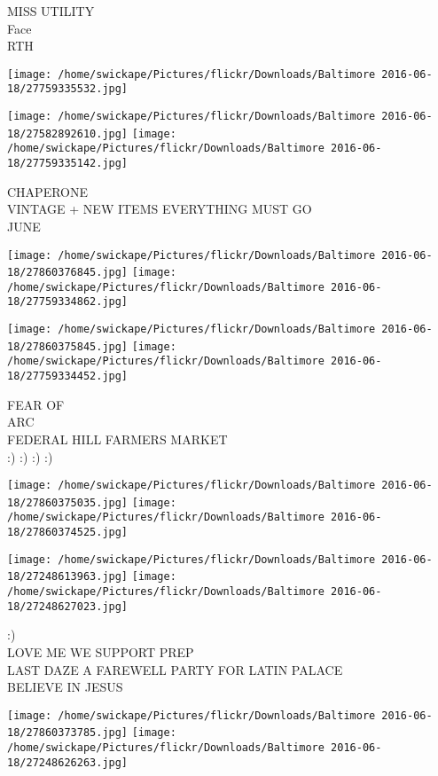 \documentclass[10pt,letterpaper]{article}
\begin{document}
MISS UTILITY\\
Face\\
RTH\\
\pagebreak

\texttt{[image: /home/swickape/Pictures/flickr/Downloads/Baltimore 2016-06-18/27759335532.jpg]}

\vspace{0.25in}
\texttt{[image: /home/swickape/Pictures/flickr/Downloads/Baltimore 2016-06-18/27582892610.jpg]}
\texttt{[image: /home/swickape/Pictures/flickr/Downloads/Baltimore 2016-06-18/27759335142.jpg]}

CHAPERONE\\
VINTAGE + NEW ITEMS EVERYTHING MUST GO\\
JUNE\\
\pagebreak

\texttt{[image: /home/swickape/Pictures/flickr/Downloads/Baltimore 2016-06-18/27860376845.jpg]}
\texttt{[image: /home/swickape/Pictures/flickr/Downloads/Baltimore 2016-06-18/27759334862.jpg]}

\texttt{[image: /home/swickape/Pictures/flickr/Downloads/Baltimore 2016-06-18/27860375845.jpg]}
\texttt{[image: /home/swickape/Pictures/flickr/Downloads/Baltimore 2016-06-18/27759334452.jpg]}

FEAR OF\\
ARC\\
FEDERAL HILL FARMERS MARKET\\
:) :) :) :)\\
\pagebreak

\texttt{[image: /home/swickape/Pictures/flickr/Downloads/Baltimore 2016-06-18/27860375035.jpg]}
\texttt{[image: /home/swickape/Pictures/flickr/Downloads/Baltimore 2016-06-18/27860374525.jpg]}

\texttt{[image: /home/swickape/Pictures/flickr/Downloads/Baltimore 2016-06-18/27248613963.jpg]}
\texttt{[image: /home/swickape/Pictures/flickr/Downloads/Baltimore 2016-06-18/27248627023.jpg]}

:)\\
LOVE ME WE SUPPORT PREP\\
LAST DAZE A FAREWELL PARTY FOR LATIN PALACE\\
BELIEVE IN JESUS\\
\pagebreak

\texttt{[image: /home/swickape/Pictures/flickr/Downloads/Baltimore 2016-06-18/27860373785.jpg]}
\texttt{[image: /home/swickape/Pictures/flickr/Downloads/Baltimore 2016-06-18/27248626263.jpg]}
\end{document}
